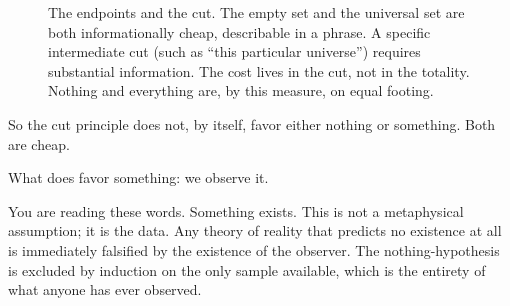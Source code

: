 \begin{figure}[h]
\centering
{}
\caption{The endpoints and the cut. The empty set and the universal set are both informationally cheap, describable in a phrase. A specific intermediate cut (such as ``this particular universe'') requires substantial information. The cost lives in the cut, not in the totality. Nothing and everything are, by this measure, on equal footing.}
\label{fig:endpoint-spectrum}
\end{figure}

So the cut principle does not, by itself, favor either nothing or something. Both are cheap.

What does favor something: we observe it.

You are reading these words. Something exists. This is not a metaphysical assumption; it is the data. Any theory of reality that predicts no existence at all is immediately falsified by the existence of the observer. The nothing-hypothesis is excluded by induction on the only sample available, which is the entirety of what anyone has ever observed.

